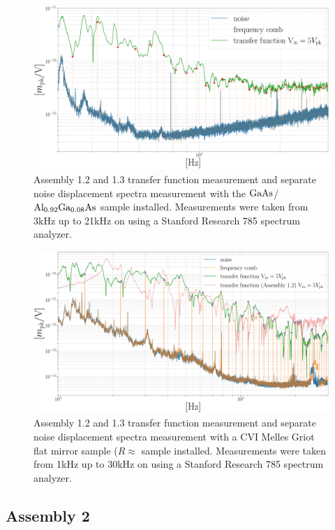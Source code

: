 \begin{figure}[H]
    \includegraphics[width=\textwidth]{figs/ALGAAS/results_figs/assembly1/1_2_algaas_tfwcmb.pdf}
    \caption{Assembly 1.2 and 1.3 transfer function measurement and separate noise displacement spectra measurement with the $\mathrm{GaAs}$/$\mathrm{Al_{0.92}Ga_{0.08}As}$ sample installed. Measurements were taken from 3kHz up to 21kHz on using a Stanford Research 785 spectrum analyzer.}
    \label{fig:assembly12and13displacementspectraalgaas}
\end{figure}

\begin{figure}[H]
    \includegraphics[width=\textwidth]{figs/ALGAAS/results_figs/assembly1/1_2_cvi_compare_tfwcmb.pdf}
    \caption{Assembly 1.2 and 1.3 transfer function measurement and separate noise displacement spectra measurement with a CVI Melles Griot flat mirror sample ($R \approx $ sample installed. Measurements were taken from 1kHz up to 30kHz on using a Stanford Research 785 spectrum analyzer.}
    \label{fig:assembly12and13displacementspectracvi}
\end{figure}

\subsection{Assembly 2}

